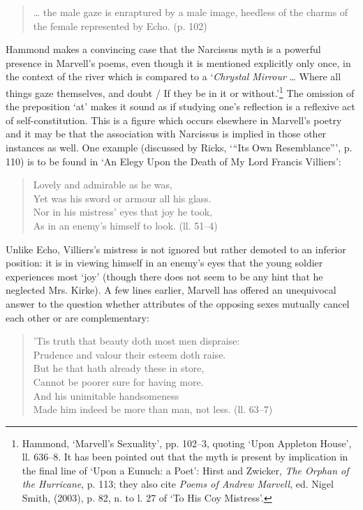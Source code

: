 ﻿\documentclass[12pt]{article}
\newcommand{\citedtitle}[1]{\textit{#1}}
\begin{document}
\begin{quote}
… the male gaze is enraptured by a male image, heedless of the charms of the female represented by Echo. (p. 102)
\end{quote}

Hammond
makes a convincing case that the Narcissus myth is a powerful presence in
Marvell’s poems, even though it is mentioned explicitly only once, in the
context of the river which is compared to a ‘\emph{Chrystal Mirrour} … Where all things gaze
themselves, and doubt / If they be in it or without.’\footnote{Hammond, ‘Marvell’s Sexuality’, pp. 102–3, quoting ‘Upon Appleton House’, ll. 636–8. It has been pointed out that the myth is present by implication in the final line of ‘Upon a Eunuch: a Poet’: Hirst and Zwicker, \citedtitle{The Orphan of the Hurricane}, p. 113; they also cite \citedtitle{Poems of Andrew Marvell}, ed. Nigel Smith, (2003), p. 82, n. to l. 27 of ‘To His Coy Mistress’.} The
omission of the preposition ‘at’ makes it sound as if studying one’s reflection
is a reflexive act of self-constitution. This is a figure which occurs
elsewhere in Marvell’s poetry and it may be that the association with Narcissus
is implied in those other instances as well. One example (discussed by Ricks, ‘“Its
Own Resemblance”’, p. 110) is to be found in ‘An Elegy Upon the Death of
My Lord Francis Villiers’:

\begin{verse}
Lovely and admirable as he was,\\
Yet was his sword or armour all his glass.\\
Nor in his mistress’ eyes that joy he took,\\
As in an enemy’s himself to look. (ll. 51–4)
\end{verse}

Unlike
Echo, Villiers’s mistress is not ignored but rather demoted to an inferior
position: it is in viewing himself in an enemy’s eyes that the young soldier
experiences most ‘joy’ (though there does not seem to be any hint that he neglected
Mrs. Kirke). A few lines earlier, Marvell has offered an unequivocal answer to
the question whether attributes of the opposing sexes mutually cancel each
other or are complementary:

\begin{verse}
’Tis truth that beauty doth most men dispraise:\\
Prudence and valour their esteem doth raise.\\
But he that hath already these in store,\\
Cannot be poorer sure for having more.\\
And his unimitable handsomeness\\
Made him indeed be more than man, not less. (ll. 63–7)
\end{verse}
\end{document}
